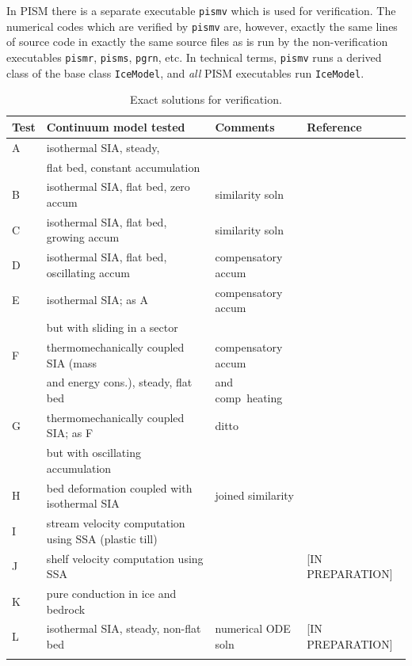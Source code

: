 \documentclass[11pt,final]{amsart}
\begin{document}
In PISM there is a separate executable \verb|pismv| which is used for verification.  The numerical codes which are verified by \verb|pismv| are, however, exactly the same lines of source code in exactly the same source files as is run by the non-verification executables \verb|pismr|, \verb|pisms|, \verb|pgrn|, etc.  In technical terms, \verb|pismv| runs a derived class of the base class \verb|IceModel|, and \emph{all} PISM executables run \verb|IceModel|.

\begin{table}[ht]
\caption{Exact solutions for verification.}\label{tab:tests}
\small
\begin{tabular}{@{}llll}\hline
\textbf{Test} & \textbf{Continuum model tested} & \textbf{Comments} & \textbf{Reference} \\ \hline
A & isothermal SIA, steady, &  & \cite{BLKCB} \\
 & flat bed, constant accumulation &  &  \\
B & isothermal SIA, flat bed, zero accum & similarity soln & \cite{BLKCB} \\
C & isothermal SIA, flat bed, growing accum & similarity soln & \cite{BLKCB} \\
D & isothermal SIA, flat bed, oscillating accum & compensatory accum & \cite{BLKCB} \\
E & isothermal SIA; as A &  compensatory accum & \cite{BLKCB} \\
 & but with sliding in a sector &  &  \\
F & thermomechanically coupled SIA (mass &  compensatory accum & \cite{BB,BBL} \\
 & and energy cons.), steady, flat bed & and comp~heating &  \\
G & thermomechanically coupled SIA; as F  & ditto & \cite{BB,BBL} \\
 & but with oscillating accumulation &  &  \\
H & bed deformation coupled with isothermal SIA & joined similarity & \cite{BLKfastearth} \\
I & stream velocity computation using SSA (plastic till) &  & \cite{SchoofStream} \\
J & shelf velocity computation using SSA  &  & [IN PREPARATION] \\
K & pure conduction in ice and bedrock & & \cite{BuelerTestK} \\
L & isothermal SIA, steady, non-flat bed & numerical ODE soln & [IN PREPARATION] \\
\hline
\normalsize
\end{tabular}
\end{table}
\end{document}
